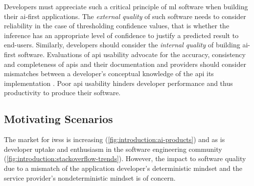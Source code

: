 Developers must appreciate such a critical principle of \gls{ml} software when building their \gls{ai}-first applications. The \textit{external quality} of such software needs to consider reliability in the case of thresholding confidence values, that is whether the inference has an appropriate level of confidence to justify a predicted result to end-users. Similarly, developers should consider the \textit{internal quality} of building \gls{ai}-first software. Evaluations of \gls{api} usability advocate for the accuracy, consistency and completeness of \glspl{api} and their documentation \citep{Piccioni:2013em,Robillard:2009uk} and providers should consider mismatches between a developer's conceptual knowledge of the \gls{api} its implementation \citep{Ko:2011fb}. Poor \gls{api} usability hinders developer performance and thus productivity to produce their software.
%
%
%

\subsection{Motivating Scenarios}
\label{ssec:introduction:motivation:scenario}

The market for \glspl{iws} is increasing (\cref{fig:introduction:ai-products}) and as is developer uptake and enthusiasm in the software engineering community (\cref{fig:introduction:stackoverflow-trends}). However, the impact to software quality due to a mismatch of the application developer's deterministic  mindset and the service provider's nondeterministic mindset is of concern.

